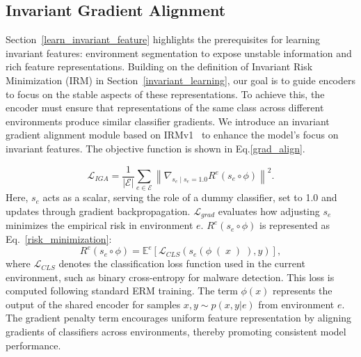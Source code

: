 
\subsection{Invariant Gradient Alignment}
\label{invariant_alignment}
Section~\ref{learn_invariant_feature} highlights the prerequisites for learning invariant features: environment segmentation to expose unstable information and rich feature representations. Building on the definition of Invariant Risk Minimization (IRM) in Section~\ref{invariant_learning}, our goal is to guide encoders to focus on the stable aspects of these representations. To achieve this, the encoder must ensure that representations of the same class across different environments produce similar classifier gradients. We introduce an invariant gradient alignment module based on IRMv1~\cite{IRM_training} to enhance the model’s focus on invariant features. The objective function is shown in Eq.\ref{grad_align}.


\begin{equation}
\label{grad_align}
\mathcal{L}_{IGA} = \frac{1}{|\mathcal{E}|} \sum_{e \in \mathcal{E}} \left\|\nabla_{s_{e} \mid s_{e}=1.0} R^{e}(s_e \circ \phi)\right\|^2.
\end{equation}
Here, $s_{e}$ acts as a scalar, serving the role of a dummy classifier, set to 1.0 and updates through gradient backpropagation. $\mathcal{L}_{grad}$ evaluates how adjusting $s_e$ minimizes the empirical risk in environment $e$. $R^e(s_e \circ \phi)$ is represented as Eq.~\ref{risk_minimization}:
\begin{equation}
\label{risk_minimization}
R^{e}(s_{e} \circ \phi)=\mathbb{E}^{e}\left[\mathcal{L}_{CLS} \left(s_{e}\left(\phi\right(x\left)\right), y\right)\right],
\end{equation}
where $\mathcal{L}_{CLS}$ denotes the classification loss function used in the current environment, such as binary cross-entropy for malware detection. This loss is computed following standard ERM training. The term $\phi(x)$ represents the output of the shared encoder for samples $x, y \sim p(x, y|e)$ from environment $e$. The gradient penalty term encourages uniform feature representation by aligning gradients of classifiers across environments, thereby promoting consistent model performance.

